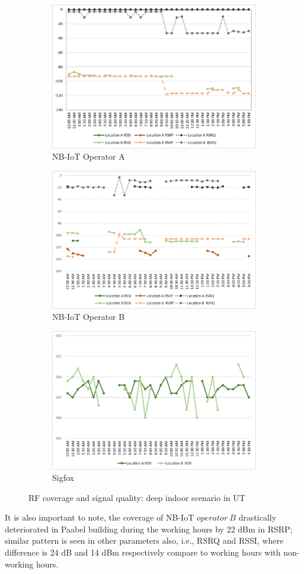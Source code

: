 \documentclass[12pt]{article}
\begin{document}
 \begin{figure}[H]
\begin{subfigure}[t]{\linewidth}
  \centering
  \includegraphics[width=.5\linewidth]{Images/tartu/ATartuDeepIndoor.pdf}  
  \caption{NB-IoT Operator A}
\end{subfigure}
\begin{subfigure}[t]{\linewidth}
  \centering
  \includegraphics[width=.5\linewidth]{Images/tartu/BTartuDeepIndoor.pdf}  
  \caption{NB-IoT Operator B}
  
\end{subfigure}
\begin{subfigure}[t]{\linewidth}
  \centering
  \includegraphics[width=.5\linewidth]{Images/tartu/STartuDeepIndoor.pdf}  
\caption{Sigfox}
 \end{subfigure}
\caption{RF coverage and signal quality: deep indoor scenario in UT}
 \label{RFDeepIndoorTartu}
\end{figure}

It is also important to note, the coverage of NB-IoT $operator\ B$ drastically deteriorated in Paabel building during the working hours by 22 dBm in RSRP; similar pattern is seen in other parameters also, i.e., RSRQ and RSSI, where difference is 24 dB and 14 dBm respectively compare to working hours with non-working hours.\par
\end{document}
